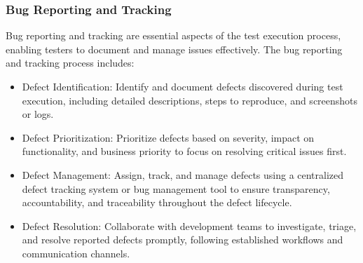 		\subsubsection{Bug Reporting and Tracking}
		
		Bug reporting and tracking are essential aspects of the test execution process, enabling testers to document and manage issues effectively. The bug reporting and tracking process includes:
		
		\begin{itemize}
			\item Defect Identification: Identify and document defects discovered during test execution, including detailed descriptions, steps to reproduce, and screenshots or logs.
			\item Defect Prioritization: Prioritize defects based on severity, impact on functionality, and business priority to focus on resolving critical issues first.
			\item Defect Management: Assign, track, and manage defects using a centralized defect tracking system or bug management tool to ensure transparency, accountability, and traceability throughout the defect lifecycle.
			\item Defect Resolution: Collaborate with development teams to investigate, triage, and resolve reported defects promptly, following established workflows and communication channels.
		\end{itemize}

		